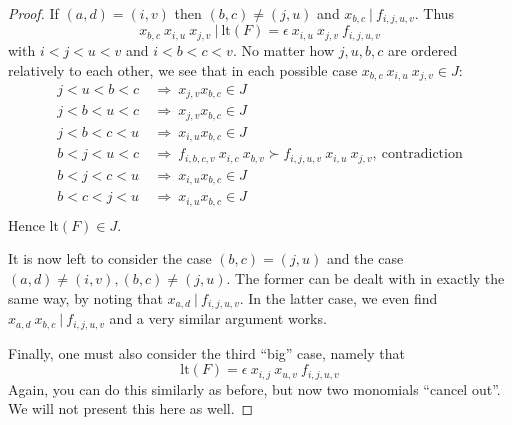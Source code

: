 \documentclass{scrartcl}
\newcommand{\contradiction}{\text{contradiction}}
\newcommand{\divides}{\ | \ }
\theoremstyle{definition}
\begin{document}
\begin{proof}
    If $(a, d) = (i, v)$ then $(b, c) \neq (j, u)$ and $x_{b, c} \divides f_{i, j, u, v}$.
    Thus
    \begin{equation*}
        x_{b, c} \ x_{i, u} \ x_{j, v} \divides \mathrm{lt}(F) = \epsilon \ x_{i, u} \ x_{j, v} \ f_{i, j, u, v}
    \end{equation*}
    with $i < j < u < v$ and $i < b < c < v$. 
    No matter how $j, u, b, c$ are ordered relatively to each other, we see that in each possible case $x_{b, c} \ x_{i, u} \ x_{j, v} \in J$:
    \begin{align*}
        j < u < b < c \ &\Rightarrow \ x_{j, v} x_{b, c} \in J \\
        j < b < u < c \ &\Rightarrow \ x_{j, v} x_{b, c} \in J \\
        j < b < c < u \ &\Rightarrow \ x_{i, u} x_{b, c} \in J \\
        b < j < u < c \ &\Rightarrow \ f_{i, b, c, v} \ x_{i, c} \ x_{b, v} \succ f_{i, j, u, v} \ x_{i, u} \ x_{j, v}, \ \contradiction \\
        b < j < c < u \ &\Rightarrow \ x_{i, u} x_{b, c} \in J \\
        b < c < j < u \ &\Rightarrow \ x_{i, u} x_{b, c} \in J \\
    \end{align*}
    Hence $\mathrm{lt}(F) \in J$.

    It is now left to consider the case $(b, c) = (j, u)$ and the case $(a, d) \neq (i, v), (b, c) \neq (j, u)$.
    The former can be dealt with in exactly the same way, by noting that $x_{a, d} \divides f_{i, j, u, v}$.
    In the latter case, we even find $x_{a, d} \ x_{b, c} \divides f_{i, j, u, v}$ and a very similar argument works.

    Finally, one must also consider the third ``big'' case, namely that
    \begin{equation*}
        \mathrm{lt}(F) = \epsilon \ x_{i, j} \ x_{u, v} \ f_{i, j, u, v} 
    \end{equation*}
    Again, you can do this similarly as before, but now two monomials ``cancel out''.
    We will not present this here as well.
\end{proof}

\printbibliography
\end{document}

